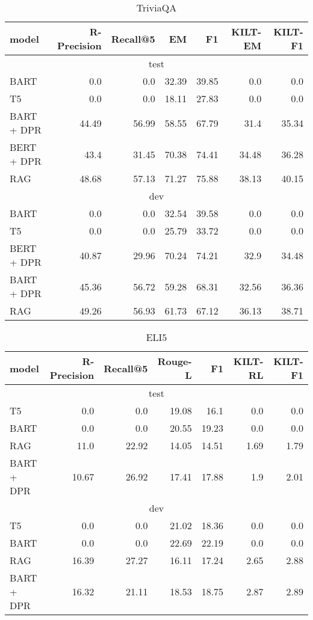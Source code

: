 \documentclass[11pt]{article}
\begin{document}
 \begin{table*}[ht]
\centering
\begin{tabular}{l@{\hskip 2em}rrrrrr}
 \toprule
model & \textbf{R-Precision} & \textbf{Recall@5} & \textbf{EM} & \textbf{F1}  & \textbf{KILT-EM}  & \textbf{KILT-F1}  \\
\midrule
\multicolumn{7}{c}{test} \\
\midrule
BART & 0.0 & 0.0 & 32.39 & 39.85 & 0.0 & 0.0 \\ 
T5 & 0.0 & 0.0 & 18.11 & 27.83 & 0.0 & 0.0 \\ 
BART + DPR & 44.49 & 56.99 & 58.55 & 67.79 & 31.4 & 35.34 \\ 
BERT + DPR & 43.4 & 31.45 & 70.38 & 74.41 & 34.48 & 36.28 \\ 
RAG & 48.68 & 57.13 & 71.27 & 75.88 & 38.13 & 40.15 \\  
\midrule
\multicolumn{7}{c}{dev} \\
\midrule
BART & 0.0 & 0.0 & 32.54 & 39.58 & 0.0 & 0.0 \\ 
T5 & 0.0 & 0.0 & 25.79 & 33.72 & 0.0 & 0.0 \\ 
BERT + DPR & 40.87 & 29.96 & 70.24 & 74.21 & 32.9 & 34.48 \\ 
BART + DPR & 45.36 & 56.72 & 59.28 & 68.31 & 32.56 & 36.36 \\ 
RAG & 49.26 & 56.93 & 61.73 & 67.12 & 36.13 & 38.71 \\  
\bottomrule
\end{tabular}
\caption{TriviaQA}
\label{tab:TQA}
\end{table*}
 \begin{table*}[ht]
\centering
\begin{tabular}{l@{\hskip 2em}rrrrrr}
 \toprule
model & \textbf{R-Precision} & \textbf{Recall@5} & \textbf{Rouge-L} & \textbf{F1}  & \textbf{KILT-RL}  & \textbf{KILT-F1}  \\
\midrule
\multicolumn{7}{c}{test} \\
\midrule
T5 & 0.0 & 0.0 & 19.08 & 16.1 & 0.0 & 0.0 \\ 
BART & 0.0 & 0.0 & 20.55 & 19.23 & 0.0 & 0.0 \\ 
RAG & 11.0 & 22.92 & 14.05 & 14.51 & 1.69 & 1.79 \\ 
BART + DPR & 10.67 & 26.92 & 17.41 & 17.88 & 1.9 & 2.01 \\ 
\midrule
\multicolumn{7}{c}{dev} \\
\midrule
T5 & 0.0 & 0.0 & 21.02 & 18.36 & 0.0 & 0.0 \\ 
BART & 0.0 & 0.0 & 22.69 & 22.19 & 0.0 & 0.0 \\ 
RAG & 16.39 & 27.27 & 16.11 & 17.24 & 2.65 & 2.88 \\ 
BART + DPR & 16.32 & 21.11 & 18.53 & 18.75 & 2.87 & 2.89 \\ 
\bottomrule
\end{tabular}
\caption{ELI5}
\label{tab:ELI5}
\end{table*}
\end{document}
